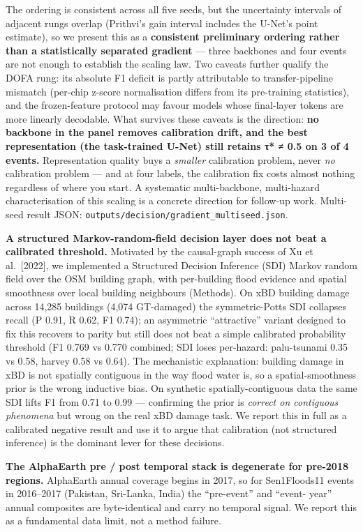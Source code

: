 The ordering is consistent across all five seeds, but the uncertainty
intervals of adjacent rungs overlap (Prithvi's gain interval includes
the U-Net's point estimate), so we present this as a \textbf{consistent
preliminary ordering rather than a statistically separated gradient} ---
three backbones and four events are not enough to establish the
scaling law. Two caveats further qualify the DOFA rung: its absolute F1
deficit is partly attributable to transfer-pipeline mismatch (per-chip
z-score normalisation differs from its pre-training statistics), and
the frozen-feature protocol may favour models whose final-layer tokens
are more linearly decodable. What survives these caveats is the
direction: \textbf{no backbone in the panel removes calibration drift, and
the best representation (the task-trained U-Net) still retains
τ* ≠ 0.5 on 3 of 4 events.} Representation quality buys a \emph{smaller}
calibration problem, never \emph{no} calibration problem --- and at four
labels, the calibration fix costs almost nothing regardless of where
you start. A systematic multi-backbone, multi-hazard characterisation
of this scaling is a concrete direction for follow-up work. Multi-seed
result JSON: \texttt{outputs/decision/gradient\_multiseed.json}.

\textbf{A structured Markov-random-field decision layer does not beat a calibrated
threshold.} Motivated by the causal-graph success of Xu et al.~{[}2022{]}, we
implemented a Structured Decision Inference (SDI) Markov random field over
the OSM building graph, with per-building flood evidence and spatial
smoothness over local building neighbours (Methods). On xBD building damage
across 14,285 buildings (4,074 GT-damaged) the symmetric-Potts SDI collapses
recall (P 0.91, R 0.62, F1 0.74); an asymmetric ``attractive'' variant designed
to fix this recovers to parity but still does not beat a simple calibrated
probability threshold (F1 0.769 vs 0.770 combined; SDI loses per-hazard:
palu-tsunami 0.35 vs 0.58, harvey 0.58 vs 0.64). The mechanistic explanation:
building damage in xBD is not spatially contiguous in the way flood water is,
so a spatial-smoothness prior is the wrong inductive bias. On synthetic
spatially-contiguous data the same SDI lifts F1 from 0.71 to 0.99 ---
confirming the prior is \emph{correct on contiguous phenomena} but wrong on the
real xBD damage task. We report this in full as a calibrated negative result
and use it to argue that calibration (not structured inference) is the
dominant lever for these decisions.

\textbf{The AlphaEarth pre / post temporal stack is degenerate for pre-2018
regions.} AlphaEarth annual coverage begins in 2017, so for Sen1Floods11
events in 2016--2017 (Pakistan, Sri-Lanka, India) the ``pre-event'' and ``event-
year'' annual composites are byte-identical and carry no temporal signal. We
report this as a fundamental data limit, not a method failure.

